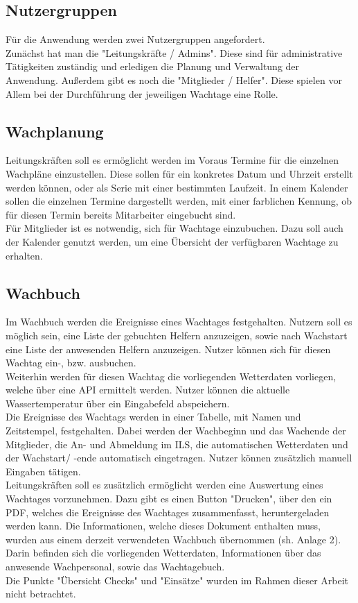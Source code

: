 \documentclass[fontsize=12pt,openright,oneside,paper=a4,BCOR=1cm]{scrbook}
\begin{document}
\subsection{Nutzergruppen}
Für die Anwendung werden zwei Nutzergruppen angefordert. \\
Zunächst hat man die "Leitungskräfte / Admins". Diese sind für administrative Tätigkeiten zuständig und erledigen die Planung und Verwaltung der Anwendung. 
Außerdem gibt es noch die "Mitglieder / Helfer". Diese spielen vor Allem bei der Durchführung der jeweiligen Wachtage eine Rolle.

\subsection{Wachplanung}
Leitungskräften soll es ermöglicht werden im Voraus Termine für die einzelnen Wachpläne einzustellen. Diese sollen für ein konkretes Datum und Uhrzeit erstellt werden können, oder als Serie mit einer bestimmten Laufzeit. In einem Kalender sollen die einzelnen Termine dargestellt werden, mit einer farblichen Kennung, ob für diesen Termin bereits Mitarbeiter eingebucht sind. \\
Für Mitglieder ist es notwendig, sich für Wachtage einzubuchen. Dazu soll auch der Kalender genutzt werden, um eine Übersicht der verfügbaren Wachtage zu erhalten.

\subsection{Wachbuch}
Im Wachbuch werden die Ereignisse eines Wachtages festgehalten. Nutzern soll es möglich sein, eine Liste der gebuchten Helfern anzuzeigen, sowie nach Wachstart eine Liste der anwesenden Helfern anzuzeigen. Nutzer können sich für diesen Wachtag ein-, bzw. ausbuchen. \\
Weiterhin werden für diesen Wachtag die vorliegenden Wetterdaten vorliegen, welche über eine API ermittelt werden. Nutzer können die aktuelle Wassertemperatur über ein Eingabefeld abspeichern. \\
Die Ereignisse des Wachtags werden in einer Tabelle, mit Namen und Zeitstempel, festgehalten. Dabei werden der Wachbeginn und das Wachende der Mitglieder, die An- und Abmeldung im ILS, die automatischen Wetterdaten und der Wachstart/ -ende automatisch eingetragen. Nutzer können zusätzlich manuell Eingaben tätigen. \\
Leitungskräften soll es zusätzlich ermöglicht werden eine Auswertung eines Wachtages vorzunehmen. Dazu gibt es einen Button "Drucken", über den ein PDF, welches die Ereignisse des Wachtages zusammenfasst, heruntergeladen werden kann. Die Informationen, welche dieses Dokument enthalten muss, wurden aus einem derzeit verwendeten Wachbuch übernommen (sh. Anlage 2). Darin befinden sich die vorliegenden Wetterdaten, Informationen über das anwesende Wachpersonal, sowie das Wachtagebuch. \\
Die Punkte "Übersicht Checks" und "Einsätze" wurden im Rahmen dieser Arbeit nicht betrachtet. 
\end{document}
